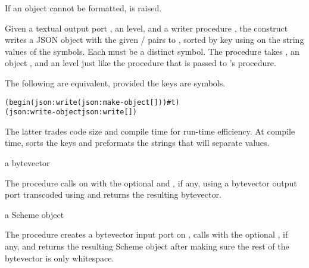 If an object cannot be formatted, 
is raised.

\begin{syntax}
\end{syntax}
\returns{} 

Given a textual output port , an  level, and a
writer procedure , the  construct
writes a JSON object with the given  /  pairs to
, sorted by key using  on the string values of
the symbols.  Each  must be a distinct symbol.  The 
procedure takes , an object , and an  level
just like the  procedure that is passed to 's
 procedure.

The following are equivalent, provided the keys are symbols.

\antipar\begin{alltt}
(begin (json:write  (json:make-object [ ] \etc) ) \#t)
(json:write-object   json:write [ ] \etc)\end{alltt}\antipar

The latter trades code size and compile time for run-time efficiency.
At compile time,  sorts the keys and
preformats the strings that will separate values.

\begin{procedure}
\end{procedure}
\returns{} a bytevector

The  procedure calls 
on  with the optional  and , if
any, using a bytevector output port transcoded using
 and returns the resulting bytevector.

\begin{procedure}
\end{procedure}
\returns{} a Scheme object

The  procedure creates a bytevector input port
on , calls  with the optional ,
if any, and returns the resulting Scheme object after making sure the rest
of the bytevector is only whitespace.

